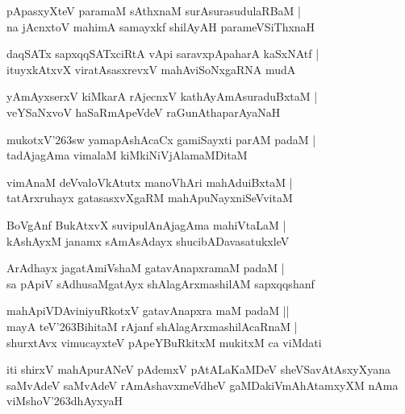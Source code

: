 \documentclass[twoside,12pt,openright]{book}
\def\S{\char'263}
\newcounter{shloka}[chapter]
\begin{document}
\begin{shloka}%
pApasxyXteV paramaM sAthxnaM surAsurasudulaRBaM |\\
na jAcnxtoV mahimA samayxkf shilAyAH parameVSiThxnaH 
\end{shloka}

\begin{shloka}%
daqSATx sapxqqSATxciRtA vApi saravxpApaharA kaSxNAtf |\\
ituyxkAtxvX viratAsasxrevxV mahAviSoNxgaRNA mudA 
\end{shloka}

\begin{shloka}%
yAmAyxserxV kiMkarA rAjecnxV kathAyAmAsuraduBxtaM |\\
veYSaNxvoV haSaRmApeVdeV raGunAthaparAyaNaH
\end{shloka}

\begin{shloka}%
mukotxV\S sw yamapAshAcaCx gamiSayxti parAM padaM |\\
tadAjagAma vimalaM kiMkiNiVjAlamaMDitaM 
\end{shloka}

\begin{shloka}%
vimAnaM deVvaloVkAtutx manoVhAri mahAduiBxtaM |\\
tatArxruhayx gatasasxvXgaRM mahApuNayxniSeVvitaM 
\end{shloka}

\begin{shloka}%
BoVgAnf BukAtxvX suvipulAnAjagAma mahiVtaLaM |\\
kAshAyxM janamx sAmAsAdayx shucibADavasatukxleV
\end{shloka}

\begin{shloka}%
ArAdhayx jagatAmiVshaM gatavAnapxramaM padaM |\\
sa pApiV sAdhusaMgatAyx shAlagArxmashilAM sapxqqshanf 
\end{shloka}

\begin{shloka}%
mahApiVDAviniyuRkotxV gatavAnapxra maM padaM ||\\
mayA teV\S BihitaM rAjanf shAlagArxmashilAcaRnaM |\\
shurxtAvx vimucayxteV pApeYBuRkitxM mukitxM ca viMdati 
\end{shloka}

\begin{center}
iti shirxV mahApurANeV pAdemxV pAtALaKaMDeV sheVSavAtAsxyXyana saMvAdeV 
saMvAdeV rAmAshavxmeVdheV gaMDakiVmAhAtamxyXM nAma viMshoV\S dhAyxyaH
\end{center}
\end{document}
